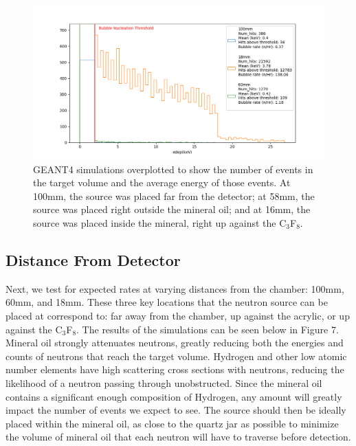 \documentclass[%
12pt,
twoside,
reprint,
amsmath,amssymb,
aps,
]{article}
\begin{document}
	\begin{figure}[!b]
		\includegraphics[scale = 0.6, center]{Images/distance_normalized.png}
		\caption{\label{tab:table-name} GEANT4 simulations overplotted to show the number of events in the target volume and the average energy of those events. At 100mm, the source was placed far from the detector; at 58mm, the source was placed right outside the mineral oil; and at 16mm, the source was placed inside the mineral, right up against the C$_{3}$F$_{8}$.}
	\end{figure}
	
	\subsection{Distance From Detector}
	\par Next, we test for expected rates at varying distances from the chamber: 100mm, 60mm, and 18mm. These three key locations that the neutron source can be placed at correspond to: far away from the chamber, up against the acrylic, or up against the C$_{3}$F$_{8}$. The results of the simulations can be seen below in Figure 7. Mineral oil strongly attenuates neutrons, greatly reducing both the energies and counts of neutrons that reach the target volume. Hydrogen and other low atomic number elements have high scattering cross sections with neutrons, reducing the likelihood of a neutron passing through unobstructed. Since the mineral oil contains a significant enough composition of Hydrogen, any amount will greatly impact the number of events we expect to see. The source should then be ideally placed within the mineral oil, as close to the quartz jar as possible to minimize the volume of mineral oil that each neutron will have to traverse before detection.
	
\end{document}
